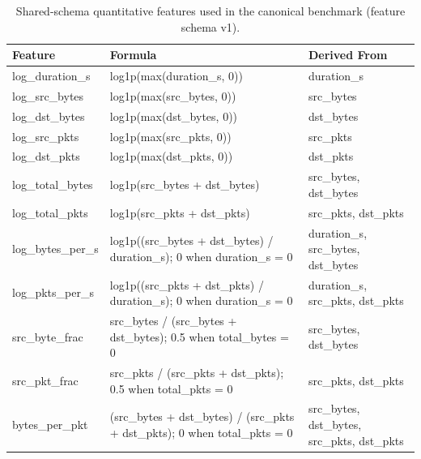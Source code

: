 \begin{table}[!tbp]
\centering
\scriptsize
\renewcommand{\arraystretch}{1.08}
\setlength{\tabcolsep}{4pt}
\caption{Shared-schema quantitative features used in the canonical benchmark (feature schema v1).}
\label{tab:shared-feature-schema-quantitative}
\begin{tabular}{p{}p{}p{}}
\toprule
Feature & Formula & Derived From \\
\midrule
log\_duration\_s & log1p(max(duration\_s, 0)) & duration\_s \\
log\_src\_bytes & log1p(max(src\_bytes, 0)) & src\_bytes \\
log\_dst\_bytes & log1p(max(dst\_bytes, 0)) & dst\_bytes \\
log\_src\_pkts & log1p(max(src\_pkts, 0)) & src\_pkts \\
log\_dst\_pkts & log1p(max(dst\_pkts, 0)) & dst\_pkts \\
log\_total\_bytes & log1p(src\_bytes + dst\_bytes) & src\_bytes, dst\_bytes \\
log\_total\_pkts & log1p(src\_pkts + dst\_pkts) & src\_pkts, dst\_pkts \\
log\_bytes\_per\_s & log1p((src\_bytes + dst\_bytes) / duration\_s); 0 when duration\_s = 0 & duration\_s, src\_bytes, dst\_bytes \\
log\_pkts\_per\_s & log1p((src\_pkts + dst\_pkts) / duration\_s); 0 when duration\_s = 0 & duration\_s, src\_pkts, dst\_pkts \\
src\_byte\_frac & src\_bytes / (src\_bytes + dst\_bytes); 0.5 when total\_bytes = 0 & src\_bytes, dst\_bytes \\
src\_pkt\_frac & src\_pkts / (src\_pkts + dst\_pkts); 0.5 when total\_pkts = 0 & src\_pkts, dst\_pkts \\
bytes\_per\_pkt & (src\_bytes + dst\_bytes) / (src\_pkts + dst\_pkts); 0 when total\_pkts = 0 & src\_bytes, dst\_bytes, src\_pkts, dst\_pkts \\
\bottomrule
\end{tabular}
\end{table}
